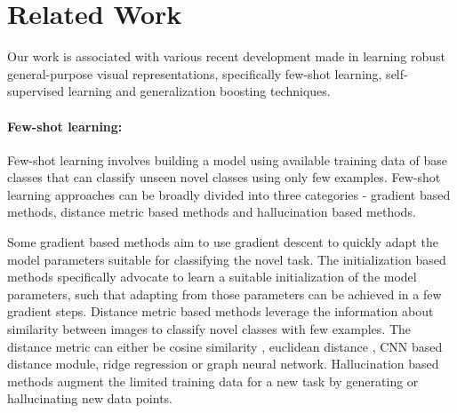 \documentclass[10pt,twocolumn,letterpaper]{article}
\begin{document}
\section{Related Work}
\label{related_work}


\begin{figure*}[t]
\centering
{}
    \label{fig:self-supervised-few-shot}
\end{figure*}


Our work is associated with various recent development made in learning robust general-purpose visual representations, specifically few-shot learning, self-supervised learning and generalization boosting techniques. 

\paragraph{Few-shot learning:}
Few-shot learning involves building a model using available training data of base classes that can classify unseen novel classes using only few examples. Few-shot learning approaches can be broadly divided into three categories - gradient based methods, distance metric based methods and hallucination based methods.

Some gradient based methods \cite{ravi2016optimization, andrychowicz2016learning} aim to use gradient descent to quickly adapt the model parameters suitable for classifying the novel task. The initialization based methods \cite{finn2017model, leo2019, nichol2018first} specifically advocate to learn a suitable initialization of the model parameters, such that adapting from those parameters can be achieved in a few gradient steps.
Distance metric based methods leverage the information about similarity between images to classify novel classes with few examples.
The distance metric can either be cosine similarity \cite{vinyals2016matching}, euclidean distance \cite{snell2017prototypical}, CNN based distance module\cite{sung2018learning}, ridge regression\cite{bertinetto2018meta} or graph neural network\cite{garcia2017few}.
Hallucination based methods \cite{hariharan2017low, wang2018low, fewshot2018hallo} augment the limited training data for a new task by generating or hallucinating new data points.
\end{document}
